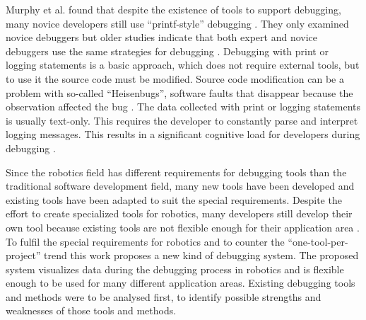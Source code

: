 Murphy et al. found that despite the existence of tools to support debugging, many novice developers still use ``printf-style'' debugging \cite{Murphy2008}. They only examined novice debuggers but older studies indicate that both expert and novice debuggers use the same strategies for debugging \cite{Gugerty1986}. Debugging with print or logging statements is a basic approach, which does not require external tools, but to use it the source code must be modified. Source code modification can be a problem with so-called ``Heisenbugs'', software faults that disappear because the observation affected the bug \cite{Grottke2005}. The data collected with print or logging statements is usually text-only. This requires the developer to constantly parse and interpret logging messages. This results in a significant cognitive load for developers during debugging \cite{Jacobs2003}.


Since the robotics field has different requirements for debugging tools than the traditional software development field, many new tools have been developed and existing tools have been adapted to suit the special requirements. %
Despite the effort to create specialized tools for robotics, many developers still develop their own tool because existing tools are not flexible enough for their application area \cite{Collett2010}. %
To fulfil the special requirements for robotics and to counter the ``one-tool-per-project'' trend this work proposes a new kind of debugging system. The proposed system visualizes data during the debugging process in robotics and is flexible enough to be used for many different application areas. Existing debugging tools and methods were to be analysed first, to identify possible strengths and weaknesses of those tools and methods.


